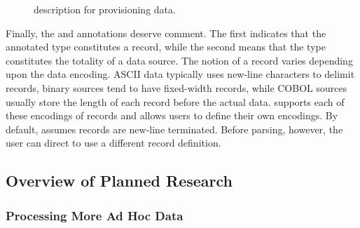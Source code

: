 \documentclass[11pt]{article}
\begin{document}
% 


% 

\begin{figure}

\caption{\pads{} description for \dibbler{} provisioning data.}
\label{figure:dibbler}
\end{figure}


Finally, the  and  annotations deserve comment.  The first
indicates that the annotated type constitutes a record,
while the second means that the type constitutes the totality of a data source.  
The notion of a record varies depending upon the data encoding.  
ASCII data typically uses new-line characters to delimit 
records, binary sources tend to have fixed-width records, while 
COBOL sources usually store the length of each record before the actual data.
\pads{} supports each of these encodings of records and allows users to define
their own encodings.  By default, \pads{} assumes records are new-line terminated.
Before parsing, however, the user can direct \pads{} to use a different record
definition.



\subsection{Overview of Planned Research}
\label{ssec:sow}



\subsubsection{Processing More Ad Hoc Data}
\end{document}
